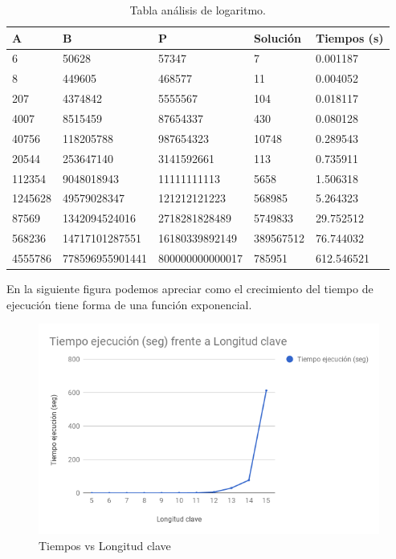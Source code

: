 \begin{table}[htbp]
	\begin{center}
		\begin{tabular}{|l|l|l|l|l|}
			\hline 
			\rowcolor{LightCyan}
			A & B & P & Solución & Tiempos (s) \\ \hline
			6 & 50628 & 57347& 7 & 0.001187 \\ \hline 
			8 & 449605 & 468577& 11 & 0.004052 \\ \hline
			207 & 4374842 & 5555567& 104 & 0.018117 \\ \hline
			4007 & 8515459 & 87654337& 430 & 0.080128\\ \hline
			40756 & 118205788 & 987654323& 10748 & 0.289543\\ \hline
			20544 & 253647140 & 3141592661& 113 & 0.735911\\ \hline
			112354 & 9048018943 & 11111111113& 5658 & 1.506318\\ \hline
			1245628 & 49579028347 & 121212121223& 568985 & 5.264323\\ \hline
			87569 & 1342094524016 & 2718281828489& 5749833 & 29.752512\\ \hline
			568236 & 14717101287551 & 16180339892149& 389567512 & 76.744032\\ \hline
			4555786 & 778596955901441 & 800000000000017& 785951 & 612.546521\\ \hline
		\end{tabular}
		\caption{Tabla análisis de logaritmo.}
		\label{tabla:compleja}
	\end{center}
\end{table}

En la siguiente figura podemos apreciar como el crecimiento del tiempo de ejecución tiene forma de una función exponencial.\\

\begin{figure}[H]
	\begin{center}
		\includegraphics[width=1\linewidth]{chart}
		\caption{Tiempos vs Longitud clave}
		\label{figura: tiempos}
	\end{center}
\end{figure}

